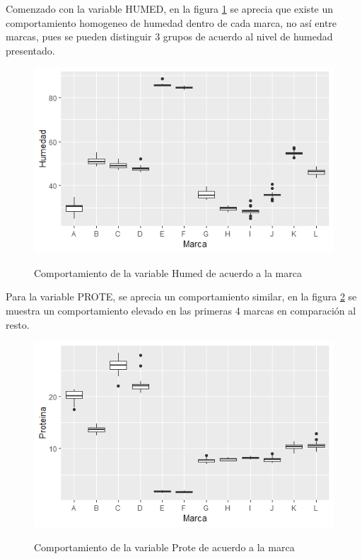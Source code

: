 \documentclass[12pt, letterpaper]{article}
\begin{document}
Comenzado con la variable HUMED, en la figura \ref{i3} se aprecia que existe un comportamiento homogeneo de humedad dentro de cada marca, no así entre marcas, pues se pueden distinguir 3 grupos de acuerdo al nivel de humedad presentado.\\

\begin{figure}[h]
\centering
\includegraphics[scale=1]{images/humed.png} 
\label{i3}
\caption{Comportamiento de la variable Humed de acuerdo a la marca}
\end{figure}

Para la variable PROTE, se aprecia un comportamiento similar, en la figura \ref{i4} se muestra un comportamiento elevado en las primeras 4 marcas en comparación al resto.\\

\begin{figure}[h]
\centering
\includegraphics[scale=1]{images/prote.png} 
\label{i4}
\caption{Comportamiento de la variable Prote de acuerdo a la marca}
\end{figure}
\end{document}
